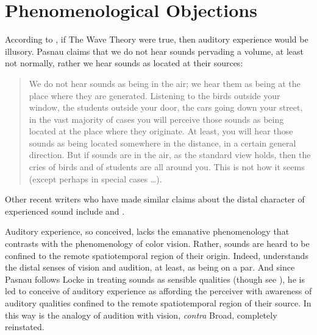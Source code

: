 
\section{Phenomenological Objections} %
\label{sec:phenomenological_objections}

According to \citet{Pasnau:1999ss}, if The Wave Theory were true, then auditory experience would be illusory. Pasnau claims that we do not hear sounds pervading a volume, at least not normally, rather we hear sounds as located at their sources:
\begin{quote}
	We do not hear sounds as being in the air; we hear them as being at the place where they are generated. Listening to the birds outside your window, the students outside your door, the cars going down your street, in the vast majority of cases you will perceive those sounds as being located at the place where they originate. At least, you will hear those sounds as being located somewhere in the distance, in a certain general direction. But if sounds are in the air, as the standard view holds, then the cries of birds and of students are all around you. This is not how it seems (except perhaps in special cases \ldots). \citep[311]{Pasnau:1999ss}
\end{quote}
Other recent writers who have made similar claims about the distal character of experienced sound include \citet{Casati:1994aa} and \citet{OCallaghan:2007xy}.

Auditory experience, so conceived, lacks the emanative phenomenology that \citet{Broad:1952kx} contrasts with the phenomenology of color vision. Rather, sounds are heard to be confined to the remote spatiotemporal region of their origin. Indeed,  \citet{Pasnau:1999ss} understands the distal senses of vision and audition, at least, as being on a par. And since Pasnau follows Locke in treating sounds as sensible qualities (though see \citealt{Pasnau:2009ys}), he is led to conceive of auditory experience as affording the perceiver with awareness of auditory qualities confined to the remote spatiotemporal region of their source. In this way is the analogy of audition with vision, \emph{contra} Broad, completely reinstated. 

